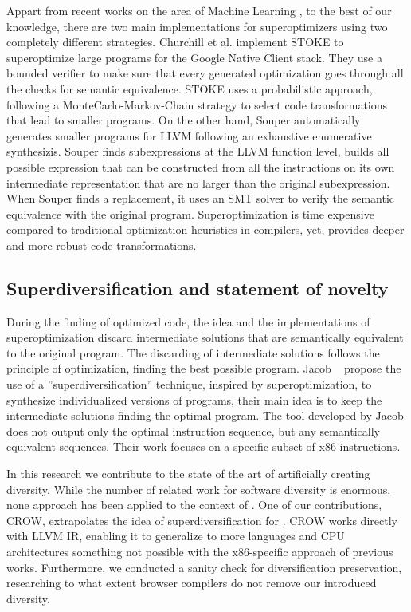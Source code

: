 Appart from recent works on the area of Machine Learning \cite{2021arXiv210913498S}, to the best of our knowledge, there are two main implementations for superoptimizers using two completely different strategies.
Churchill et al. \cite{churchill_sound_nodate} implement STOKE to superoptimize large programs for the  Google Native Client stack. They use a bounded verifier to make sure that every generated optimization goes through all the checks for semantic equivalence. STOKE uses a probabilistic approach, following a MonteCarlo-Markov-Chain strategy to select code transformations that lead to smaller programs.
On the other hand, Souper \cite{bansal_automatic_nodate} automatically generates smaller programs for LLVM following an exhaustive enumerative synthesizis. Souper finds subexpressions at the LLVM function level, builds all possible expression that can be constructed from all the instructions on its own intermediate representation that are no larger than the original subexpression. When Souper finds a replacement, it uses an SMT solver \cite{SMT_solver} to verify the semantic equivalence with the original program. 
Superoptimization is time expensive compared to traditional optimization heuristics in compilers, yet, provides deeper and more robust code transformations.


\subsection*{Superdiversification and statement of novelty}

During the finding of optimized code, the idea and the implementations of superoptimization discard intermediate solutions that are semantically equivalent to the original program. The discarding of intermediate solutions follows the principle of optimization, finding the best possible program. Jacob \etal~\cite{jacob2008superdiversifier} propose the use of a ''superdiversification'' technique, inspired by superoptimization,
to synthesize individualized versions of programs, their main idea is to keep the intermediate solutions finding the optimal program.
The tool developed by Jacob \etal does not output only the optimal instruction sequence, but any semantically equivalent sequences.
Their work focuses on a specific subset of x86 instructions.

In this research we contribute to the state of the art of artificially creating diversity. While the number of related work for software diversity is enormous, none approach has been applied to the context of \wasm. One of our contributions, CROW, extrapolates the idea of superdiversification for \wasm. CROW works directly with LLVM IR, enabling it to generalize to more languages and CPU architectures something not possible with the x86-specific approach of previous works.
Furthermore, we conducted a sanity check for diversification preservation, researching to what extent browser compilers do not remove our introduced diversity.

